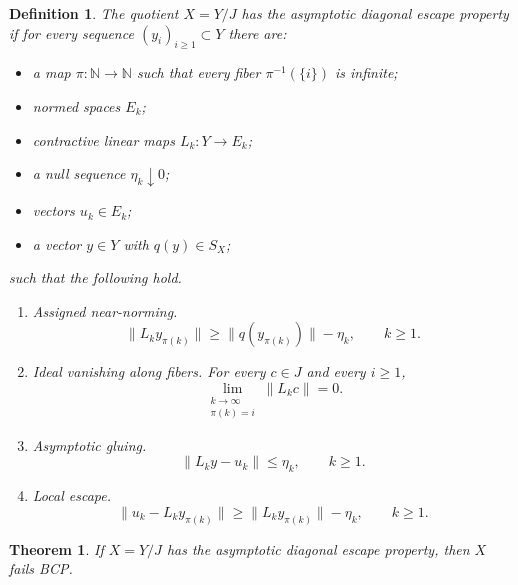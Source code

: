 \documentclass[11pt]{article}
\newtheorem{theorem}{Theorem}
\newtheorem{definition}{Definition}
\newcommand{\N}{\mathbb N}
\begin{document}
\begin{definition}
\label{def:asymptotic-diagonal}
The quotient \(X=Y/J\) has the asymptotic diagonal escape property if for
every sequence \((y_i)_{i\ge1}\subset Y\) there are:
\begin{itemize}
\item a map \(\pi:\N\to\N\) such that every fiber \(\pi^{-1}(\{i\})\) is
infinite;
\item normed spaces \(E_k\);
\item contractive linear maps \(L_k:Y\to E_k\);
\item a null sequence \(\eta_k\downarrow0\);
\item vectors \(u_k\in E_k\);
\item a vector \(y\in Y\) with \(q(y)\in S_X\);
\end{itemize}
such that the following hold.

\begin{enumerate}
\item \emph{Assigned near-norming.}
\[
        \|L_k y_{\pi(k)}\|
        \ge
        \|q(y_{\pi(k)})\|-\eta_k,\qquad k\ge1.
\]

\item \emph{Ideal vanishing along fibers.}  For every \(c\in J\) and every
\(i\ge1\),
\[
        \lim_{\substack{k\to\infty\\ \pi(k)=i}}\|L_kc\|=0.
\]

\item \emph{Asymptotic gluing.}
\[
        \|L_ky-u_k\|\le \eta_k,\qquad k\ge1.
\]

\item \emph{Local escape.}
\[
        \|u_k-L_k y_{\pi(k)}\|
        \ge
        \|L_k y_{\pi(k)}\|-\eta_k,\qquad k\ge1.
\]
\end{enumerate}
\end{definition}

\begin{theorem}
\label{thm:asymptotic-diagonal}
If \(X=Y/J\) has the asymptotic diagonal escape property, then \(X\) fails
BCP.
\end{theorem}
\end{document}
